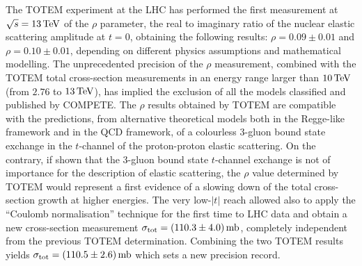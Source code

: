 The TOTEM experiment at the LHC has performed the first measurement at $\sqrt s = 13\,{\rm TeV}$ of the $\rho$ parameter, the real to imaginary ratio of the nuclear elastic scattering amplitude at $t=0$, obtaining the following results: $\rho = 0.09 \pm 0.01$ and $\rho = 0.10 \pm 0.01$, depending on different physics assumptions and mathematical modelling. The unprecedented precision of the $\rho$ measurement, combined with the TOTEM total cross-section measurements in an energy range larger than $10\,{\rm TeV}$ (from $2.76$ to $13\,{\rm TeV}$), has implied the exclusion of all the models classified and published by COMPETE. The $\rho$ results obtained by TOTEM are compatible with the predictions, from alternative theoretical models both in the Regge-like framework and in the QCD framework, of a colourless 3-gluon bound state exchange in the $t$-channel of the proton-proton elastic scattering. On the contrary, if shown that the 3-gluon bound state $t$-channel exchange is not of importance for the description of elastic scattering, the $\rho$ value determined by TOTEM would represent a first evidence of a slowing down of the total cross-section growth at higher energies.
%
The very low-$|t|$ reach allowed also to apply the ``Coulomb normalisation'' technique for the first time to LHC data and obtain a new cross-section measurement $\sigma_{\rm tot} = (110.3 \pm 4.0)\,{\rm mb}$, completely independent from the previous TOTEM determination. Combining the two TOTEM results yields $\sigma_{\rm tot} = (110.5 \pm 2.6)\,{\rm mb}$ which sets a new precision record.
